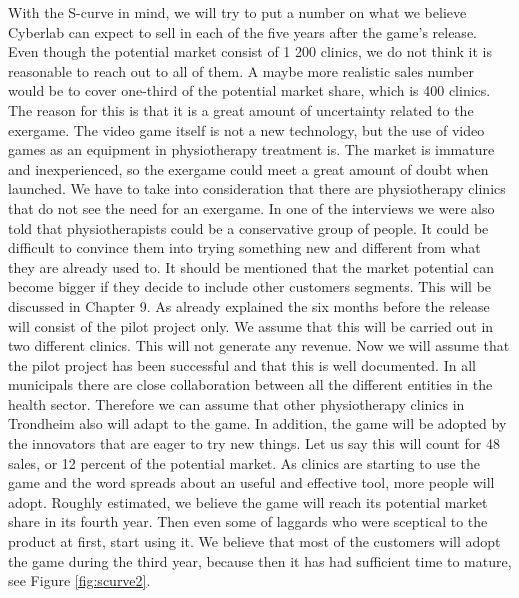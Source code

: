 With the S-curve in mind, we will try to put a number on what we believe Cyberlab can expect to sell in each of the five years after the game’s release. Even though the potential market consist of 1 200 clinics, we do not think it is reasonable to reach out to all of them. A maybe more realistic sales number would be to cover one-third of the potential market share, which is 400 clinics. The reason for this is that it is a great amount of uncertainty related to the exergame. The video game itself is not a new technology, but the use of video games as an equipment in physiotherapy treatment is. The market is immature and inexperienced, so the exergame could meet a great amount of doubt when launched. We have to take into consideration that there are physiotherapy clinics that do not see the need for an exergame. In one of the interviews we were also told that physiotherapists could be a conservative group of people. It could be difficult to convince them into trying something new and different from what they are already used to. It should be mentioned that the market potential can become bigger if they decide to include other customers segments. This will be discussed in Chapter 9. As already explained the six months before the release will consist of the pilot project only. We assume that this will be carried out in two different clinics. This will not generate any revenue. Now we will assume that the pilot project has been successful and that this is well documented. In all municipals there are close collaboration between all the different entities in the health sector. Therefore we can assume that other physiotherapy clinics in Trondheim also will adapt to the game. In addition, the game will be adopted by the innovators that are eager to try new things. Let us say this will count for 48 sales, or 12 percent of the potential market. As clinics are starting to use the game and the word spreads about an useful and effective tool, more people will adopt. Roughly estimated, we believe the game will reach its potential market share in its fourth year. Then even some of laggards who were sceptical to the product at first, start using it. We believe that most of the customers will adopt the game during the third year, because then it has had sufficient time to mature, see Figure \ref{fig:scurve2}. \\ \\ 
